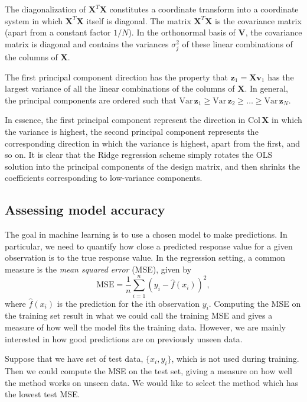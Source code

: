 \documentclass[a4paper]{article}
\begin{document}
\begin{multicols}{2}
The diagonalization of $\mathbf{X}^T\mathbf{X}$ constitutes a coordinate transform into a coordinate system in which $\mathbf{X}^T\mathbf{X}$ itself is diagonal. The matrix $\mathbf{X}^T\mathbf{X}$ is the covariance matrix (apart from a constant factor $1/N$). In the orthonormal basis of $\mathbf{V}$, the covariance matrix is diagonal and contains the variances $\sigma_j^2$ of these linear combinations of the columns of $\mathbf{X}$.

The first principal component direction has the property that $\mathbf{z}_1=\mathbf{X}\mathbf{v}_1$ has the largest variance of all the linear combinations of the columns of $\mathbf{X}$. In general, the principal components are ordered such that $\text{Var}\,\mathbf{z}_1\ge \text{Var}\,\mathbf{z}_2\ge\dots \ge\text{Var}\,\mathbf{z}_N$.

In essence, the first principal component represent the direction in $\text{Col}\,\mathbf{X}$ in which the variance is highest, the second principal component represents the corresponding direction in which the variance is highest, apart from the first, and so on. It is clear that the Ridge regression scheme simply rotates the OLS solution into the principal components of the design matrix, and then shrinks the coefficients corresponding to low-variance components. 

\subsection{Assessing model accuracy \label{sect:accuracy}}
The goal in machine learning is to use a chosen model to make predictions. In particular, we need to quantify how close 
a predicted response value for a given observation is to the true response value.
In the regression setting, a common measure is the \textit{mean squared error} (MSE), given by 
\begin{equation}
 \text{MSE} = \frac{1}{n} \sum_{i=1}^n \left( y_i - \hat{f}(x_i) \right)^2,
\end{equation}
where $\hat{f}(x_i)$ is the prediction for the ith observation $y_i$. Computing the MSE on the training set result in what we 
could call the training MSE and gives a measure of how well the model fits the training data. However, we are mainly interested 
in how good predictions are on previously unseen data.

Suppose that we have set of test data, $\{x_i,y_i\}$, which is not used during training. Then we could compute the MSE on 
the test set, giving a measure on how well the method works on unseen data. We would like to select the method which has 
the lowest test MSE. 


\end{multicols}
\end{document}

